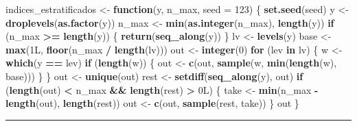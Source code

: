 \documentclass[
]{article}
\newenvironment{Shaded}{\begin{snugshade}}{\end{snugshade}}
\newcommand{\AttributeTok}[1]{\textcolor[rgb]{0.13,0.29,0.53}{#1}}
\newcommand{\ControlFlowTok}[1]{\textcolor[rgb]{0.13,0.29,0.53}{\textbf{#1}}}
\newcommand{\DecValTok}[1]{\textcolor[rgb]{0.00,0.00,0.81}{#1}}
\newcommand{\FunctionTok}[1]{\textcolor[rgb]{0.13,0.29,0.53}{\textbf{#1}}}
\newcommand{\NormalTok}[1]{#1}
\newcommand{\OtherTok}[1]{\textcolor[rgb]{0.56,0.35,0.01}{#1}}
\newcommand{\SpecialCharTok}[1]{\textcolor[rgb]{0.81,0.36,0.00}{\textbf{#1}}}
\begin{document}
\begin{Shaded}
\begin{Highlighting}[]
\NormalTok{indices\_estratificados }\OtherTok{\textless{}{-}} \ControlFlowTok{function}\NormalTok{(y, n\_max, }\AttributeTok{seed =} \DecValTok{123}\NormalTok{) \{}
  \FunctionTok{set.seed}\NormalTok{(seed)}
\NormalTok{  y }\OtherTok{\textless{}{-}} \FunctionTok{droplevels}\NormalTok{(}\FunctionTok{as.factor}\NormalTok{(y))}
\NormalTok{  n\_max }\OtherTok{\textless{}{-}} \FunctionTok{min}\NormalTok{(}\FunctionTok{as.integer}\NormalTok{(n\_max), }\FunctionTok{length}\NormalTok{(y))}
  \ControlFlowTok{if}\NormalTok{ (n\_max }\SpecialCharTok{\textgreater{}=} \FunctionTok{length}\NormalTok{(y)) \{}
    \FunctionTok{return}\NormalTok{(}\FunctionTok{seq\_along}\NormalTok{(y))}
\NormalTok{  \}}
\NormalTok{  lv }\OtherTok{\textless{}{-}} \FunctionTok{levels}\NormalTok{(y)}
\NormalTok{  base }\OtherTok{\textless{}{-}} \FunctionTok{max}\NormalTok{(1L, }\FunctionTok{floor}\NormalTok{(n\_max }\SpecialCharTok{/} \FunctionTok{length}\NormalTok{(lv)))}
\NormalTok{  out }\OtherTok{\textless{}{-}} \FunctionTok{integer}\NormalTok{(}\DecValTok{0}\NormalTok{)}
  \ControlFlowTok{for}\NormalTok{ (lev }\ControlFlowTok{in}\NormalTok{ lv) \{}
\NormalTok{    w }\OtherTok{\textless{}{-}} \FunctionTok{which}\NormalTok{(y }\SpecialCharTok{==}\NormalTok{ lev)}
    \ControlFlowTok{if}\NormalTok{ (}\FunctionTok{length}\NormalTok{(w)) \{}
\NormalTok{      out }\OtherTok{\textless{}{-}} \FunctionTok{c}\NormalTok{(out, }\FunctionTok{sample}\NormalTok{(w, }\FunctionTok{min}\NormalTok{(}\FunctionTok{length}\NormalTok{(w), base)))}
\NormalTok{    \}}
\NormalTok{  \}}
\NormalTok{  out }\OtherTok{\textless{}{-}} \FunctionTok{unique}\NormalTok{(out)}
\NormalTok{  rest }\OtherTok{\textless{}{-}} \FunctionTok{setdiff}\NormalTok{(}\FunctionTok{seq\_along}\NormalTok{(y), out)}
  \ControlFlowTok{if}\NormalTok{ (}\FunctionTok{length}\NormalTok{(out) }\SpecialCharTok{\textless{}}\NormalTok{ n\_max }\SpecialCharTok{\&\&} \FunctionTok{length}\NormalTok{(rest) }\SpecialCharTok{\textgreater{}}\NormalTok{ 0L) \{}
\NormalTok{    take }\OtherTok{\textless{}{-}} \FunctionTok{min}\NormalTok{(n\_max }\SpecialCharTok{{-}} \FunctionTok{length}\NormalTok{(out), }\FunctionTok{length}\NormalTok{(rest))}
\NormalTok{    out }\OtherTok{\textless{}{-}} \FunctionTok{c}\NormalTok{(out, }\FunctionTok{sample}\NormalTok{(rest, take))}
\NormalTok{  \}}
\NormalTok{  out}
\NormalTok{\}}
\end{Highlighting}
\end{Shaded}

\begin{center}\rule{0.5\linewidth}{0.5pt}\end{center}
\end{document}
